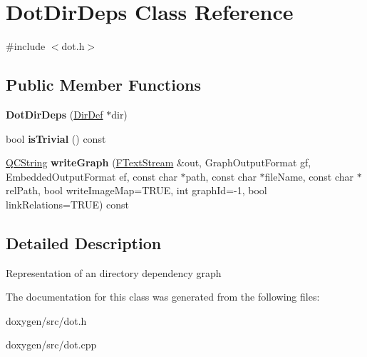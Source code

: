 \hypertarget{class_dot_dir_deps}{}\section{Dot\+Dir\+Deps Class Reference}
\label{class_dot_dir_deps}


{\ttfamily \#include $<$dot.\+h$>$}

\subsection*{Public Member Functions}
\begin{DoxyCompactItemize}
\item 
\mbox{\label{class_dot_dir_deps_a265d81baaeb7a83e2203dd55785fd10e}} 
{\bfseries Dot\+Dir\+Deps} (\mbox{\hyperlink{class_dir_def}{Dir\+Def}} $\ast$dir)
\item 
\mbox{\label{class_dot_dir_deps_aa548463f44e0bd642df965a746b751fa}} 
bool {\bfseries is\+Trivial} () const
\item 
\mbox{\label{class_dot_dir_deps_a5cd6bd58a20bae4bdc023f5cbc1e0e1a}} 
\mbox{\hyperlink{class_q_c_string}{Q\+C\+String}} {\bfseries write\+Graph} (\mbox{\hyperlink{class_f_text_stream}{F\+Text\+Stream}} \&out, Graph\+Output\+Format gf, Embedded\+Output\+Format ef, const char $\ast$path, const char $\ast$file\+Name, const char $\ast$rel\+Path, bool write\+Image\+Map=T\+R\+UE, int graph\+Id=-\/1, bool link\+Relations=T\+R\+UE) const
\end{DoxyCompactItemize}


\subsection{Detailed Description}
Representation of an directory dependency graph 

The documentation for this class was generated from the following files\+:\begin{DoxyCompactItemize}
\item 
doxygen/src/dot.\+h\item 
doxygen/src/dot.\+cpp\end{DoxyCompactItemize}
